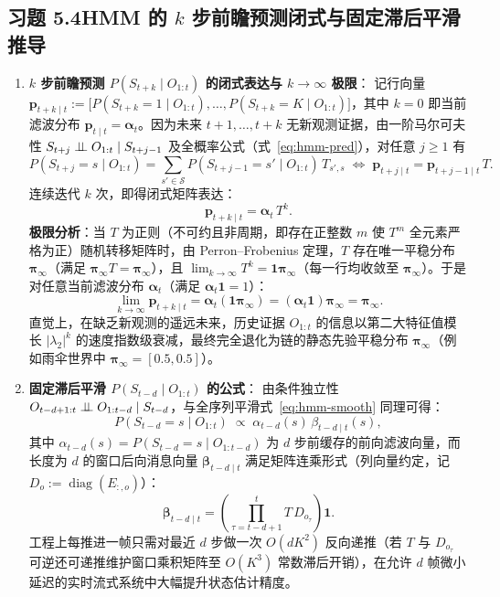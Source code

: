 \subsection*{习题 5.4\quad HMM 的 $k$ 步前瞻预测闭式与固定滞后平滑推导}
\begin{enumerate}[label=(\arabic*), leftmargin=1.8em]
  \item \textbf{$k$ 步前瞻预测 $P(S_{t+k} \mid O_{1:t})$ 的闭式表达与 $k\to\infty$ 极限}：
  记行向量 $\mathbf{p}_{t+k \mid t} := \big[P(S_{t+k}=1 \mid O_{1:t}), \dots, P(S_{t+k}=K \mid O_{1:t})\big]$，其中 $k=0$ 即当前滤波分布 $\mathbf{p}_{t\mid t} = \boldsymbol{\alpha}_t$。因为未来 $t+1,\dots,t+k$ 无新观测证据，由一阶马尔可夫性 $S_{t+j} \perp\!\!\!\perp O_{1:t} \mid S_{t+j-1}$ 及全概率公式（式~\eqref{eq:hmm-pred}），对任意 $j \ge 1$ 有
  \[
    P(S_{t+j} = s \mid O_{1:t}) = \sum_{s' \in \mathcal{S}} P(S_{t+j-1} = s' \mid O_{1:t})\, T_{s', s}
    \;\Longleftrightarrow\;
    \mathbf{p}_{t+j \mid t} = \mathbf{p}_{t+j-1 \mid t}\, T.
  \]
  连续迭代 $k$ 次，即得闭式矩阵表达：
  \[
    \mathbf{p}_{t+k \mid t} = \boldsymbol{\alpha}_t\, T^k.
  \]
  \textbf{极限分析}：当 $T$ 为正则（不可约且非周期，即存在正整数 $m$ 使 $T^m$ 全元素严格为正）随机转移矩阵时，由 Perron--Frobenius 定理，$T$ 存在唯一平稳分布 $\boldsymbol{\pi}_\infty$（满足 $\boldsymbol{\pi}_\infty T = \boldsymbol{\pi}_\infty$），且 $\lim_{k\to\infty} T^k = \mathbf{1}\boldsymbol{\pi}_\infty$（每一行均收敛至 $\boldsymbol{\pi}_\infty$）。于是对任意当前滤波分布 $\boldsymbol{\alpha}_t$（满足 $\boldsymbol{\alpha}_t \mathbf{1} = 1$）：
  \[
    \lim_{k\to\infty} \mathbf{p}_{t+k \mid t} = \boldsymbol{\alpha}_t (\mathbf{1}\boldsymbol{\pi}_\infty) = (\boldsymbol{\alpha}_t \mathbf{1})\boldsymbol{\pi}_\infty = \boldsymbol{\pi}_\infty.
  \]
  直觉上，在缺乏新观测的遥远未来，历史证据 $O_{1:t}$ 的信息以第二大特征值模长 $|\lambda_2|^k$ 的速度指数级衰减，最终完全退化为链的静态先验平稳分布 $\boldsymbol{\pi}_\infty$（例如雨伞世界中 $\boldsymbol{\pi}_\infty = [0.5, 0.5]$）。
  \item \textbf{固定滞后平滑 $P(S_{t-d} \mid O_{1:t})$ 的公式}：
  由条件独立性 $O_{t-d+1:t} \perp\!\!\!\perp O_{1:t-d} \mid S_{t-d}$，与全序列平滑式~\eqref{eq:hmm-smooth} 同理可得：
  \[
    P(S_{t-d} = s \mid O_{1:t}) \;\propto\; \alpha_{t-d}(s)\, \beta_{t-d \mid t}(s),
  \]
  其中 $\alpha_{t-d}(s) = P(S_{t-d}=s \mid O_{1:t-d})$ 为 $d$ 步前缓存的前向滤波向量，而长度为 $d$ 的窗口后向消息向量 $\boldsymbol{\beta}_{t-d\mid t}$ 满足矩阵连乘形式（列向量约定，记 $D_o := \operatorname{diag}(E_{:, o})$）：
  \[
    \boldsymbol{\beta}_{t-d \mid t} = \left(\prod_{\tau=t-d+1}^{t} T\, D_{o_\tau}\right)\mathbf{1}.
  \]
  工程上每推进一帧只需对最近 $d$ 步做一次 $O(d K^2)$ 反向递推（若 $T$ 与 $D_{o_\tau}$ 可逆还可递推维护窗口乘积矩阵至 $O(K^3)$ 常数滞后开销），在允许 $d$ 帧微小延迟的实时流式系统中大幅提升状态估计精度。
\end{enumerate}


